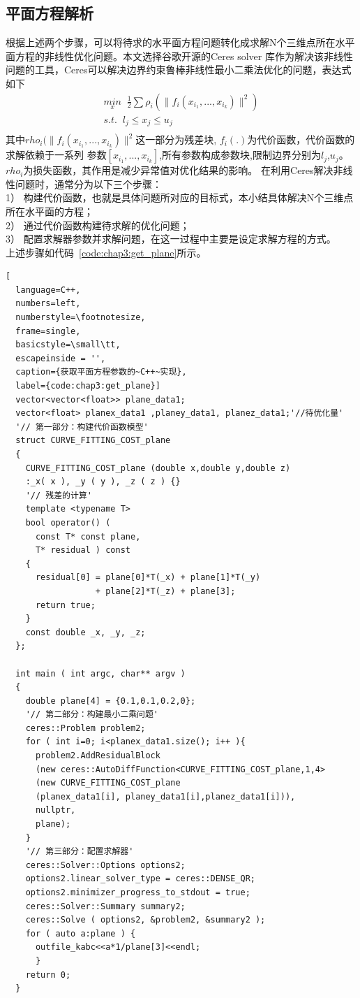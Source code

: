 \subsection{平面方程解析}
根据上述两个步骤，可以将待求的水平面方程问题转化成求解N个三维点所在水平面方程的非线性优化问题。本文选择谷歌开源的Ceres solver
库作为解决该非线性问题的工具，Ceres可以解决边界约束鲁棒非线性最小二乘法优化的问题，表达式如下
\begin{equation}
\begin{array}{l}\underset x{min}\;\;\frac12\sum\rho_i(\parallel f_i(x_{i_1},...,x_{i_k})\parallel^2)
\\s.t.\;\;l_j\leq x_j\leq u_j\\\end{array}
\end{equation}
其中$rho_i(\parallel f_i(x_{i_1},...,x_{i_k})\parallel^2$这一部分为残差块, $f_i(.)$为代价函数，代价函数的求解依赖于一系列
参数$[x_{i_1},...,x_{i_k}]$,所有参数构成参数块,限制边界分别为$l_j$,$u_j$。$rho_i$为损失函数，其作用是减少异常值对优化结果的影响。
在利用Ceres解决非线性问题时，通常分为以下三个步骤：\\
1）	构建代价函数，也就是具体问题所对应的目标式，本小结具体解决N个三维点所在水平面的方程；\\
2）	通过代价函数构建待求解的优化问题；\\
3）	配置求解器参数并求解问题，在这一过程中主要是设定求解方程的方式。\\
上述步骤如代码~\ref{code:chap3:get_plane}所示。
\begin{lstlisting}[
  language=C++,
  numbers=left,                
  numberstyle=\footnotesize,
  frame=single,     
  basicstyle=\small\tt,    
  escapeinside = '',
  caption={获取平面方程参数的~C++~实现},
  label={code:chap3:get_plane}]
  vector<vector<float>> plane_data1;
  vector<float> planex_data1 ,planey_data1, planez_data1;'//待优化量'
  '// 第一部分：构建代价函数模型'
  struct CURVE_FITTING_COST_plane
  {
    CURVE_FITTING_COST_plane (double x,double y,double z)
    :_x( x ), _y ( y ), _z ( z ) {}
    '// 残差的计算'
    template <typename T>
    bool operator() (
      const T* const plane,    
      T* residual ) const 
    {
      residual[0] = plane[0]*T(_x) + plane[1]*T(_y) 
                  + plane[2]*T(_z) + plane[3]; 
      return true;
    }
    const double _x, _y, _z;
  };

  int main ( int argc, char** argv )
  {   
    double plane[4] = {0.1,0.1,0.2,0};
    '// 第二部分：构建最小二乘问题'
    ceres::Problem problem2;
    for ( int i=0; i<planex_data1.size(); i++ ){
      problem2.AddResidualBlock 
      (new ceres::AutoDiffFunction<CURVE_FITTING_COST_plane,1,4> 
      (new CURVE_FITTING_COST_plane 
      (planex_data1[i], planey_data1[i],planez_data1[i])),
      nullptr,
      plane);
    }
    '// 第三部分：配置求解器'
    ceres::Solver::Options options2;    
    options2.linear_solver_type = ceres::DENSE_QR;
    options2.minimizer_progress_to_stdout = true; 
    ceres::Solver::Summary summary2;                 
    ceres::Solve ( options2, &problem2, &summary2 );
    for ( auto a:plane ) {
      outfile_kabc<<a*1/plane[3]<<endl;
      }
    return 0;
  }
\end{lstlisting}
